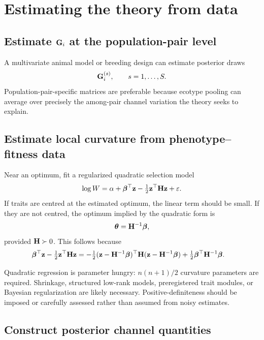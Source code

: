 \chapter{Estimating the theory from data}

\section{Estimate \(\mathbf{G}_i\) at the population-pair level}

A multivariate animal model or breeding design can estimate posterior draws
\begin{equation}
\mathbf{G}_i^{(s)},
\qquad s=1,\ldots,S.
\end{equation}
Population-pair-specific matrices are preferable because ecotype pooling can average over precisely the among-pair channel variation the theory seeks to explain.

\section{Estimate local curvature from phenotype--fitness data}

Near an optimum, fit a regularized quadratic selection model
\begin{equation}
\log W
=\alpha+\boldsymbol{\beta}^\top\mathbf z
-\tfrac12\mathbf z^\top\mathbf{H}\mathbf z+\varepsilon.
\label{eq:empiricalQuadraticSelection}
\end{equation}
If traits are centred at the estimated optimum, the linear term should be small. If they are not centred, the optimum implied by the quadratic form is
\begin{equation}
\boldsymbol{\theta}=\mathbf{H}^{-1}\boldsymbol{\beta},
\end{equation}
provided \(\mathbf{H}\succ0\). This follows because
\begin{align}
\boldsymbol{\beta}^\top\mathbf z-\tfrac12\mathbf z^\top\mathbf{H}\mathbf z
&=-\tfrac12(\mathbf z-\mathbf{H}^{-1}\boldsymbol{\beta})^\top\mathbf{H}
(\mathbf z-\mathbf{H}^{-1}\boldsymbol{\beta})
+\tfrac12\boldsymbol{\beta}^\top\mathbf{H}^{-1}\boldsymbol{\beta}.
\end{align}

\begin{cautionbox}
Quadratic regression is parameter hungry: \(n(n+1)/2\) curvature parameters are required. Shrinkage, structured low-rank models, preregistered trait modules, or Bayesian regularization are likely necessary. Positive-definiteness should be imposed or carefully assessed rather than assumed from noisy estimates.
\end{cautionbox}

\section{Construct posterior channel quantities}

